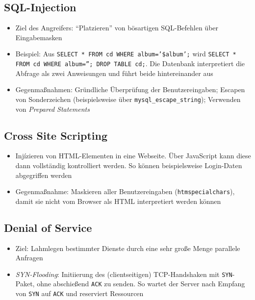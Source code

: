 \subsection{SQL-Injection}
\begin{itemize}
	\item Ziel des Angreifers: "`Platzieren"' von bösartigen SQL-Befehlen über Eingabemasken
	\item Beispiel: Aus \texttt{SELECT * FROM cd WHERE album='\$album';} wird \texttt{SELECT * FROM cd WHERE album=''; DROP TABLE cd;}. Die Datenbank interpretiert die Abfrage als zwei Anweisungen und führt beide hintereinander aus
	\item Gegenmaßnahmen: Gründliche Überprüfung der Benutzereingaben; Escapen von Sonderzeichen (beispielsweise über \texttt{mysql\_escape\_string}); Verwenden von \textit{Prepared Statements}
\end{itemize}


\subsection{Cross Site Scripting}
\begin{itemize}
	\item Injízieren von HTML-Elementen in eine Webseite. Über JavaScript kann diese dann vollständig kontrolliert werden. So können beispielsweise Login-Daten abgegriffen werden
	\item Gegenmaßnahme: Maskieren aller Benutzereingaben (\texttt{htmspecialchars}), damit sie nicht vom Browser als HTML interpretiert werden können
\end{itemize}


\subsection{Denial of Service}
\begin{itemize}
	\item Ziel: Lahmlegen bestimmter Dienste durch eine sehr große Menge parallele Anfragen
	\item \textit{SYN-Flooding}: Initiierung des (clientseitigen) TCP-Handshaken mit \texttt{SYN}-Paket, ohne abschießend \texttt{ACK} zu senden. So wartet der Server nach Empfang von \texttt{SYN} auf \texttt{ACK} und reserviert Ressourcen
\end{itemize}
